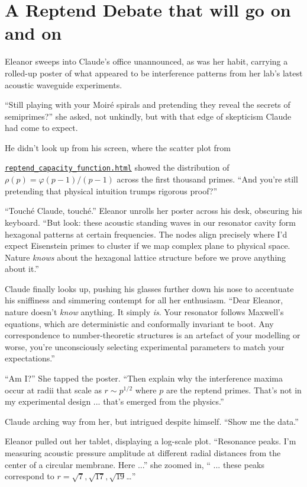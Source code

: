 \newpage
\section*{A Reptend Debate that will go on and on}

Eleanor sweeps into Claude's office unannounced, as was her habit, carrying a rolled-up poster of what appeared to be interference patterns from her lab's latest acoustic waveguide experiments.

``Still playing with your Moiré spirals and pretending they reveal the secrets of semiprimes?'' she asked, not unkindly, but with that edge of skepticism Claude had come to expect.

He didn't look up from his screen, where the scatter plot from 

\noindent
\href{reptend_capacity_function.html}{\texttt{reptend\_capacity\_function.html}} showed the distribution of $\rho(p) = \varphi(p-1)/(p-1)$ across the first thousand primes. ``And you're still pretending that physical intuition trumps rigorous proof?''

``Touché Claude, touché.'' Eleanor unrolls her poster across his desk, obscuring his keyboard. ``But look: these acoustic standing waves in our resonator cavity form hexagonal patterns at certain frequencies. The nodes align precisely where I'd expect Eisenstein primes to cluster if we map complex plane to physical space. Nature \emph{knows} about the hexagonal lattice structure before we prove anything about it.''

Claude finally looks up, pushing his glasses further down his nose to accentuate his sniffiness and simmering contempt for all her enthusiasm. ``Dear Eleanor, nature doesn't \emph{know} anything. It simply \emph{is}. Your resonator follows Maxwell's equations, which are deterministic and conformally invariant te boot. Any correspondence to number-theoretic structures is an artefact of your modelling or worse, you're unconsciously selecting experimental parameters to match your expectations.''

``Am I?'' She tapped the poster. ``Then explain why the interference maxima occur at radii that scale as $r \sim p^{1/2}$ where $p$ are the reptend primes. That's not in my experimental design ... that's emerged from the physics.''

Claude arching way from her, but intrigued despite himself. ``Show me the data.''

Eleanor pulled out her tablet, displaying a log-scale plot. ``Resonance peaks. I'm measuring acoustic pressure amplitude at different radial distances from the center of a circular membrane. Here ...'' she zoomed in, `` ... these peaks correspond to $r = \sqrt{7}, \sqrt{17}, \sqrt{19}$\ldots''

